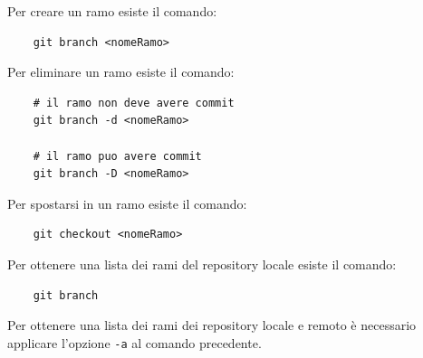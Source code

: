 Per creare un ramo esiste il comando:
\begin{lstlisting}
    git branch <nomeRamo>
\end{lstlisting}
Per eliminare un ramo esiste il comando:
\begin{lstlisting}
    # il ramo non deve avere commit
    git branch -d <nomeRamo>

    # il ramo puo avere commit
    git branch -D <nomeRamo>
\end{lstlisting}
Per spostarsi in un ramo esiste il comando:
\begin{lstlisting}
    git checkout <nomeRamo>
\end{lstlisting}
Per ottenere una lista dei rami del repository locale esiste il comando:
\begin{lstlisting}
    git branch
\end{lstlisting}
Per ottenere una lista dei rami dei repository locale e remoto è necessario applicare l'opzione \texttt{-a} al comando precedente.


